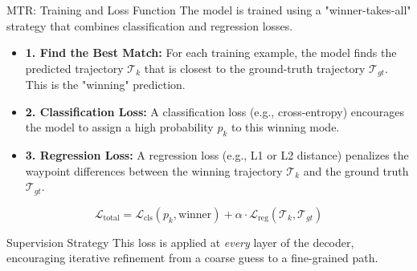 \documentclass[10pt,aspectratio=169]{beamer}
\begin{document}
\begin{frame}{MTR: Training and Loss Function}
    The model is trained using a "winner-takes-all" strategy that combines classification and regression losses.
    \begin{itemize}
        \item \textbf{1. Find the Best Match:} For each training example, the model finds the predicted trajectory $\mathcal{T}_k$ that is closest to the ground-truth trajectory $\mathcal{T}_{gt}$. This is the "winning" prediction.
        \item \textbf{2. Classification Loss:} A classification loss (e.g., cross-entropy) encourages the model to assign a high probability $p_k$ to this winning mode.
        \item \textbf{3. Regression Loss:} A regression loss (e.g., L1 or L2 distance) penalizes the waypoint differences between the winning trajectory $\mathcal{T}_k$ and the ground truth $\mathcal{T}_{gt}$.
    \end{itemize}
    \begin{equation}
        \mathcal{L}_{\text{total}} = \mathcal{L}_{\text{cls}}(p_k, \text{winner}) + \alpha \cdot \mathcal{L}_{\text{reg}}(\mathcal{T}_k, \mathcal{T}_{gt})
    \end{equation}
    \begin{alertblock}{Supervision Strategy}
        This loss is applied at \emph{every} layer of the decoder, encouraging iterative refinement from a coarse guess to a fine-grained path.
    \end{alertblock}
\end{frame}
\end{document}
